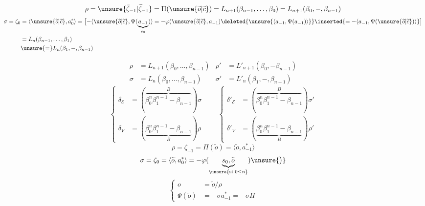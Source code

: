\[
\rho=\unsure{\bar\zeta_{-1}|\widetilde\zeta_{-1}}
=\Pi(\unsure{\widetilde o|\widetilde c})
=L_{n+1}(\beta_{n-1},\ldots,\beta_0)
=L_{n+1}(\beta_0,\mathbin{-},\beta_{n-1})
\]
\[
\begin{aligned}
\sigma=\zeta_0
&=\langle\unsure{\widetilde o|\widetilde c},a_0^*\rangle
=\bigl[-\langle\unsure{\widetilde o|\widetilde c},\Psi(\underbrace{a_{-1}}_{s_0})\rangle
=-\varphi(\unsure{\widetilde o|\widetilde c},a_{-1})
\deleted{\unsure{\langle a_{-1},\Psi(a_{-1})\rangle}}
\inserted{=-\langle a_{-1},\Psi(\unsure{\widetilde o|\widetilde c})\rangle}\bigr]\\
&=L_n(\beta_{n-1},\ldots,\beta_1)\\
&\unsure{=}L_n(\beta_1,\mathbin{-},\beta_{n-1})
\end{aligned}
\]

\[
\begin{aligned}
\rho&=L_{n+1}(\beta_0,\ldots,\beta_{n-1})
&\rho'&=L'_{n+1}(\beta_0,\mathbin{-}\beta_{n-1})\\
\sigma&=L_n(\beta_0,\ldots,\beta_{n-1})
&\sigma'&=L'_n(\beta_1,\mathbin{-},\beta_{n-1})
\end{aligned}
\]
\[
\left\{\begin{aligned}
\delta_{\mathcal E}&=(\overbrace{\beta_0^n\beta_1^{n-1}\mathbin{-}\beta_{n-1}}^B)\sigma\\
\delta_V&=(\underbrace{\beta_0^n\beta_1^{n-1}\mathbin{-}\beta_{n-1}}_B)\rho
\end{aligned}\right.
\qquad
\left\{\begin{aligned}
\delta'_{\mathcal E}&=(\overbrace{\beta_0^n\beta_1^{n-1}\mathbin{-}\beta_{n-1}}^B)\sigma'\\
\delta'_V&=(\underbrace{\beta_0^n\beta_1^{n-1}\mathbin{-}\beta_{n-1}}_B)\rho'
\end{aligned}\right.
\]
\margin{\[
\widetilde o=\rho a_{-1}+\sigma a_0+\zeta_1a_1\mathbin{-}+\zeta_na_n
\qquad(\zeta_n=1,\zeta_{n-1}=2\ldots)
\]}
\[
\rho=\zeta_{-1}=\Pi(\widetilde o)=\langle\widetilde o,a_{-1}^*\rangle
\]
\[
\sigma=\zeta_0=\langle\widetilde o,a_0^*\rangle
=-\varphi(\underbrace{s_0,\widetilde o}_{\unsure{\text{si }0\leq n}})\unsure{\big)}
\]
\[
\left\{\begin{aligned}
o&=\widetilde o/\rho\\
\Psi(\widetilde o)&=-\sigma a_{-1}^*=-\sigma\Pi
\end{aligned}\right.
\]
\margin{\[
o'=2o=
\left\{\begin{aligned}
&\deleted{\unsure{2}}\widetilde o/\rho'&&n\text{ pair}\\
&\deleted{\unsure{\widetilde o/\rho'}}
2\widetilde o/\rho&&n\text{ impair}\\
&\text{''}\quad2\widetilde o/\rho'
\end{aligned}\right.
\]}
